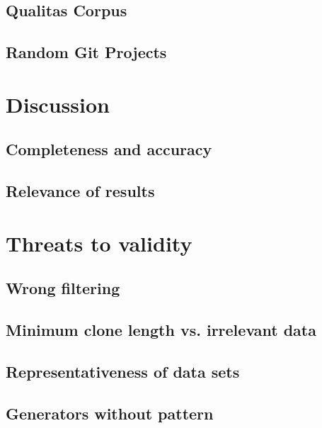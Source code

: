 \subsection{Qualitas Corpus}

\subsection{Random Git Projects}

\section{Discussion}

\subsection{Completeness and accuracy}

\subsection{Relevance of results}

\section{Threats to validity}

\subsection{Wrong filtering}

\subsection{Minimum clone length vs. irrelevant data}

\subsection{Representativeness of data sets}

\subsection{Generators without pattern}